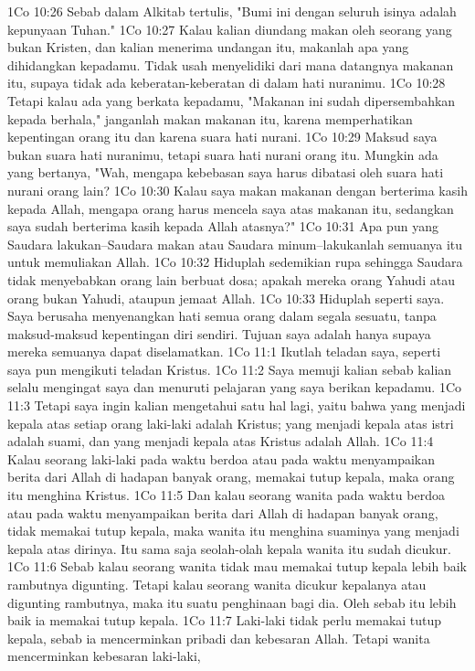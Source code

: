 1Co 10:26  Sebab dalam Alkitab tertulis, "Bumi ini dengan seluruh isinya adalah kepunyaan Tuhan."
1Co 10:27  Kalau kalian diundang makan oleh seorang yang bukan Kristen, dan kalian menerima undangan itu, makanlah apa yang dihidangkan kepadamu. Tidak usah menyelidiki dari mana datangnya makanan itu, supaya tidak ada keberatan-keberatan di dalam hati nuranimu.
1Co 10:28  Tetapi kalau ada yang berkata kepadamu, "Makanan ini sudah dipersembahkan kepada berhala," janganlah makan makanan itu, karena memperhatikan kepentingan orang itu dan karena suara hati nurani.
1Co 10:29  Maksud saya bukan suara hati nuranimu, tetapi suara hati nurani orang itu. Mungkin ada yang bertanya, "Wah, mengapa kebebasan saya harus dibatasi oleh suara hati nurani orang lain?
1Co 10:30  Kalau saya makan makanan dengan berterima kasih kepada Allah, mengapa orang harus mencela saya atas makanan itu, sedangkan saya sudah berterima kasih kepada Allah atasnya?"
1Co 10:31  Apa pun yang Saudara lakukan--Saudara makan atau Saudara minum--lakukanlah semuanya itu untuk memuliakan Allah.
1Co 10:32  Hiduplah sedemikian rupa sehingga Saudara tidak menyebabkan orang lain berbuat dosa; apakah mereka orang Yahudi atau orang bukan Yahudi, ataupun jemaat Allah.
1Co 10:33  Hiduplah seperti saya. Saya berusaha menyenangkan hati semua orang dalam segala sesuatu, tanpa maksud-maksud kepentingan diri sendiri. Tujuan saya adalah hanya supaya mereka semuanya dapat diselamatkan.
1Co 11:1  Ikutlah teladan saya, seperti saya pun mengikuti teladan Kristus.
1Co 11:2  Saya memuji kalian sebab kalian selalu mengingat saya dan menuruti pelajaran yang saya berikan kepadamu.
1Co 11:3  Tetapi saya ingin kalian mengetahui satu hal lagi, yaitu bahwa yang menjadi kepala atas setiap orang laki-laki adalah Kristus; yang menjadi kepala atas istri adalah suami, dan yang menjadi kepala atas Kristus adalah Allah.
1Co 11:4  Kalau seorang laki-laki pada waktu berdoa atau pada waktu menyampaikan berita dari Allah di hadapan banyak orang, memakai tutup kepala, maka orang itu menghina Kristus.
1Co 11:5  Dan kalau seorang wanita pada waktu berdoa atau pada waktu menyampaikan berita dari Allah di hadapan banyak orang, tidak memakai tutup kepala, maka wanita itu menghina suaminya yang menjadi kepala atas dirinya. Itu sama saja seolah-olah kepala wanita itu sudah dicukur.
1Co 11:6  Sebab kalau seorang wanita tidak mau memakai tutup kepala lebih baik rambutnya digunting. Tetapi kalau seorang wanita dicukur kepalanya atau digunting rambutnya, maka itu suatu penghinaan bagi dia. Oleh sebab itu lebih baik ia memakai tutup kepala.
1Co 11:7  Laki-laki tidak perlu memakai tutup kepala, sebab ia mencerminkan pribadi dan kebesaran Allah. Tetapi wanita mencerminkan kebesaran laki-laki,
